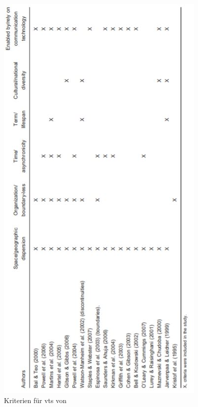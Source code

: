 \documentclass[a4paper,11pt]{article}%
\renewcommand{\\}{\vspace*{0.5\baselineskip} \newline}
\begin{document}
\begin{figure}[H]
		\begin{footnotesize}
			\includegraphics[scale=1]{Abbildungen/criteriaForVirtualTeams.JPG}
			\caption[Kriterien für \ac{vts}]{Kriterien für \ac{vts} von \citep[p. 27]{schweitzer2010conceptualizing}}
			\label{criteriaForVirtualTeams}
		\end{footnotesize}
	\end{figure}	
	
	
\end{document}
